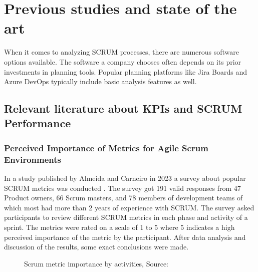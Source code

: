 \newpage

\section{Previous studies and state of the art}\label{SOTAStudies}

When it comes to analyzing SCRUM processes, there are numerous software options available. 
The software a company chooses often depends on its prior investments in planning tools. 
Popular planning platforms like Jira Boards and Azure DevOps typically include basic analysis 
features as well.

\subsection{Relevant literature about KPIs and SCRUM Performance}

\subsubsection{Perceived Importance of Metrics for Agile Scrum Environments}

In a study published by Almeida and Carneiro in 2023 a survey about popular SCRUM metrics 
was conducted \parencite{PercPerfOfMetrForAgileScrumEnv}. 
The survey got 191 valid responses from 47 Product owners, 66 Scrum masters, 
and 78 members of development teams of which most had more than 2 years of experience with SCRUM. 
The survey asked participants to review different SCRUM metrics in each phase and activity of a sprint.
The metrics were rated on a scale of 1 to 5 where 5 indicates a high perceived importance 
of the metric by the participant. 
After data analysis and discussion of the results, some exact conclusions were made.


\begin{figure}[!th]
\centering
{}    
\decoRule
\caption[SCRUM metrics]{Scrum metric importance by activities, Source: \cite{PercPerfOfMetrForAgileScrumEnv}}
\label{fig:ScrumMetricsImportance}
\end{figure}

